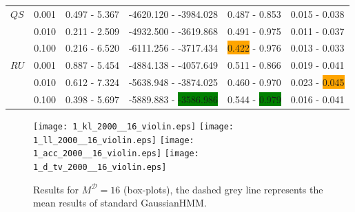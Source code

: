 \documentclass[shortabstract]{iithesis}
\begin{document}
\begin{table}[!ht]
\begin{tabular}{llllll}
$QS$ & 0.001 &  0.497 - 5.367 &   -4620.120 - -3984.028 &  0.487 - 0.853 &  0.015 - 0.038 \\
        & 0.010 &  0.211 - 2.509 &    -4932.500 - -3619.868 &  0.491 - 0.975 &  0.011 - 0.037 \\
        & 0.100 &   0.216 - 6.520 &  -6111.256 - -3717.434 &  \colorbox{orange}{0.422} - 0.976 &  0.013 - 0.033 \\
$RU$ & 0.001 &  0.887 - 5.454 &  -4884.138 - -4057.649 &  0.511 - 0.866 &  0.019 - 0.041 \\
        & 0.010 &  0.612 - 7.324 &  -5638.948 - -3874.025 &    0.460 - 0.970 &  0.023 - \colorbox{orange}{0.045} \\
        & 0.100 &  0.398 - 5.697 &  -5889.883 - \colorbox{green}{-3586.986} &  0.544 - \colorbox{green}{0.979} &  0.016 - 0.041 \\
\hline
\end{tabular}
\end{table}

\newpage

\begin{figure}[!ht] 
    \centering
    \texttt{[image: 1\_kl\_2000\_\_16\_violin.eps]}
    \texttt{[image: 1\_ll\_2000\_\_16\_violin.eps]}
    \texttt{[image: 1\_acc\_2000\_\_16\_violin.eps]}
    \texttt{[image: 1\_d\_tv\_2000\_\_16\_violin.eps]}
    \caption{Results for $M^{\mathcal D}=16$ (box-plots), the dashed grey line represents the mean results of standard GaussianHMM.}
    \label{fig:res_ex1_16}
\end{figure}




\pagebreak
\end{document}
